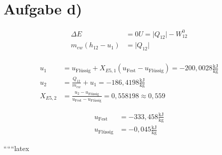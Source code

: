 \section*{Aufgabe d)}

\begin{align*}
\Delta E &= 0U = \lvert Q_{12} \rvert - W_{12}^0 \\
m_{ew} (h_{12} - u_1) &= \lvert Q_{12} \rvert \\
\end{align*}

\begin{align*}
u_1 &= u_{\text{Flüssig}} + X_{E5,1} (u_{\text{Fest}} - u_{\text{Flüssig}}) = -200,0028 \frac{\text{kJ}}{\text{kg}} \\
u_2 &= \frac{Q_{12}}{m_{ew}} + u_1 = -186,4198 \frac{\text{kJ}}{\text{kg}} \\
X_{E5,2} &= \frac{u_2 - u_{\text{Flüssig}}}{u_{\text{Fest}} - u_{\text{Flüssig}}} = 0,558198 \approx 0,559
\end{align*}

\begin{align*}
u_{\text{Fest}} &= -333,458 \frac{\text{kJ}}{\text{kg}} \\
u_{\text{Flüssig}} &= -0,045 \frac{\text{kJ}}{\text{kg}}
\end{align*}

``````latex